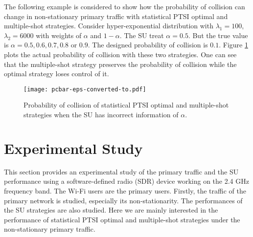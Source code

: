 \documentclass[10pt,final,journal,letterpaper]{IEEEtran}
\begin{document}
\par
The following example is considered to show how the probability of collision can change in non-stationary primary traffic with statistical PTSI optimal and multiple-shot strategies. Consider hyper-exponential distribution with $\lambda_1=100$, $\lambda_2=6000$ with weights of $\alpha$ and $1-\alpha$. The SU treat $\alpha=0.5$. But the true value is $\alpha=0.5,0.6,0.7,0.8$ or $0.9$. The designed probability of collision is $0.1$. Figure \ref{fig:pcbar} plots the actual probability of collision with these two strategies. One can see that the multiple-shot strategy preserves the probability of collision while the optimal strategy loses control of it.
\begin{figure}[!h]
\centering
\texttt{[image: pcbar-eps-converted-to.pdf]}
\caption{Probability of collision of statistical PTSI optimal and multiple-shot strategies when the SU has incorrect information of $\alpha$.}
\label{fig:pcbar}
\end{figure}

\section{Experimental Study}\label{sec:6}
This section provides an experimental study of the primary traffic and the SU performance using a software-defined radio (SDR) device working on the 2.4 GHz frequency band. The Wi-Fi users are the primary users. Firstly, the traffic of the primary network is studied, especially its non-stationarity. The performances of the SU strategies are also studied. Here we are mainly interested in the performance of statistical PTSI optimal and multiple-shot strategies under the non-stationary primary traffic.
\end{document}
